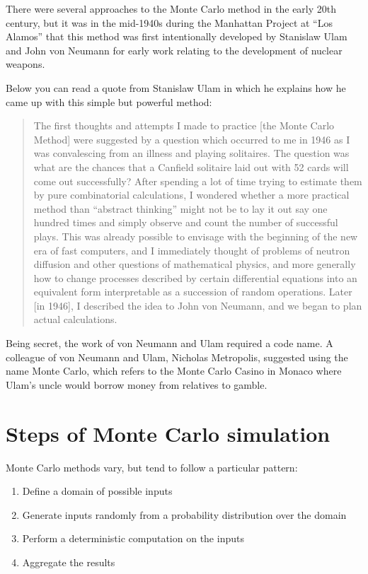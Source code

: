 \documentclass[
]{book}
\theoremstyle{definition}
\theoremstyle{definition}
\theoremstyle{definition}
\theoremstyle{definition}
\theoremstyle{remark}
\begin{document}
There were several approaches to the Monte Carlo method in the early 20th century, but it was in the mid-1940s during the Manhattan Project at ``Los Alamos'' that this method was first intentionally developed by Stanislaw Ulam and John von Neumann for early work relating to the development of nuclear weapons.

Below you can read a quote from Stanislaw Ulam in which he explains how he came up with this simple but powerful method:

\begin{quote}
The first thoughts and attempts I made to practice {[}the Monte Carlo Method{]} were suggested by a question which occurred to me in 1946 as I was convalescing from an illness and playing solitaires. The question was what are the chances that a Canfield solitaire laid out with 52 cards will come out successfully? After spending a lot of time trying to estimate them by pure combinatorial calculations, I wondered whether a more practical method than ``abstract thinking'' might not be to lay it out say one hundred times and simply observe and count the number of successful plays. This was already possible to envisage with the beginning of the new era of fast computers, and I immediately thought of problems of neutron diffusion and other questions of mathematical physics, and more generally how to change processes described by certain differential equations into an equivalent form interpretable as a succession of random operations. Later {[}in 1946{]}, I described the idea to John von Neumann, and we began to plan actual calculations.
\end{quote}

Being secret, the work of von Neumann and Ulam required a code name. A colleague of von Neumann and Ulam, Nicholas Metropolis, suggested using the name Monte Carlo, which refers to the Monte Carlo Casino in Monaco where Ulam's uncle would borrow money from relatives to gamble.

\hypertarget{steps-of-monte-carlo-simulation}{%
\section{Steps of Monte Carlo simulation}\label{steps-of-monte-carlo-simulation}}

Monte Carlo methods vary, but tend to follow a particular pattern:

\begin{enumerate}
\def\labelenumi{\arabic{enumi}.}
\item
  Define a domain of possible inputs
\item
  Generate inputs randomly from a probability distribution over the domain
\item
  Perform a deterministic computation on the inputs
\item
  Aggregate the results
\end{enumerate}
\end{document}
